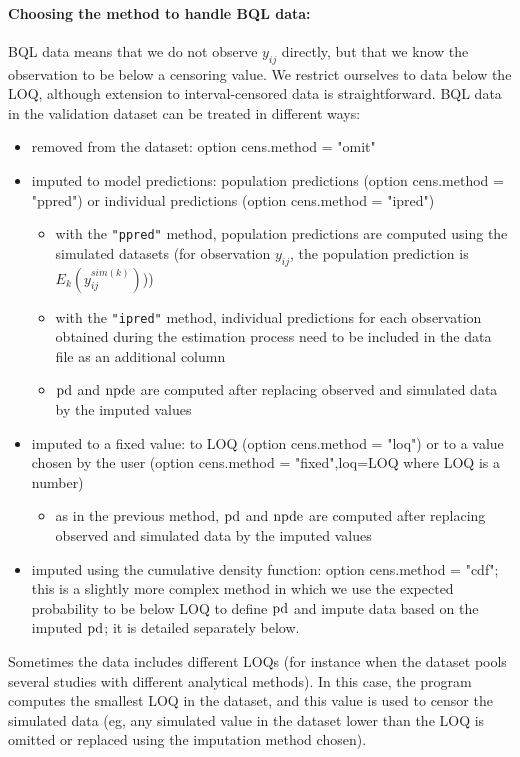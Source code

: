 \paragraph{Choosing the method to handle BQL data:} BQL data means that we do not observe $y_{ij}$ directly, but 
that we know the observation to be below a censoring value. We restrict ourselves to data below the LOQ, although 
extension to interval-censored data is straightforward. BQL data in the validation dataset can be treated in 
different ways: 
\begin{itemize} 
\item removed from the dataset: option {\sf cens.method = "omit"} 
\item imputed to model predictions: population predictions (option {\sf cens.method = "ppred"}) or individual predictions (option {\sf cens.method = "ipred"}) 
    \begin{itemize} 
    \item with the \texttt{"ppred"} method, population predictions are computed using the simulated datasets (for observation $y_{ij}$, the population prediction is $E_k(y^{sim(k)}_{ij})$)) 
    \item with the \texttt{"ipred"} method, individual predictions for each observation obtained during the estimation process need to be included in the data file as an additional column 
    \item ${\rm pd}$ and ${\rm npde}$ are computed after replacing observed and simulated data by the imputed values 
    \end{itemize} 
\item imputed  to a fixed value: to LOQ (option {\sf cens.method = "loq"}) or to a value chosen by the user (option {\sf cens.method = "fixed",loq=LOQ} where LOQ is a number) 
    \begin{itemize} 
    \item as in the previous method, ${\rm pd}$ and ${\rm npde}$ are computed after replacing observed and simulated data by the imputed values 
    \end{itemize} 
\item imputed using the cumulative density function: option {\sf cens.method = "cdf"}; this is a slightly more complex method in which we use the expected probability to be below LOQ to define ${\rm pd}$ and impute data based on the imputed ${\rm pd}$; it is detailed separately below. 
\end{itemize} 
Sometimes the data includes different LOQs (for 
instance when the dataset pools several studies with different analytical methods). In this case, the program 
computes the smallest LOQ in the dataset, and this value is used to censor the simulated data (eg, any simulated 
value in the dataset lower than the LOQ is omitted or replaced using the imputation method chosen).

